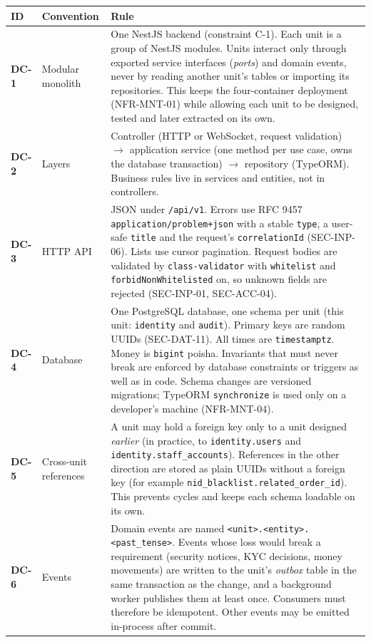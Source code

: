 \documentclass[11pt,a4paper]{article}
\newenvironment{dtable}[1]{\small\begin{longtable}{#1}}{\end{longtable}}
\begin{document}
\begin{dtable}{@{}>{\bfseries}p{1.1cm}>{\raggedright\arraybackslash}p{3.4cm}>{\raggedright\arraybackslash}p{10.6cm}@{}}
\toprule
\textnormal{\textbf{ID}} & \textbf{Convention} & \textbf{Rule} \\ \midrule \endhead
DC-1 & Modular monolith & One NestJS backend (constraint C-1). Each unit is a group of NestJS modules. Units interact only through exported service interfaces (\emph{ports}) and domain events, never by reading another unit's tables or importing its repositories. This keeps the four-container deployment (NFR-MNT-01) while allowing each unit to be designed, tested and later extracted on its own. \\
DC-2 & Layers & Controller (HTTP or WebSocket, request validation) $\rightarrow$ application service (one method per use case, owns the database transaction) $\rightarrow$ repository (TypeORM). Business rules live in services and entities, not in controllers. \\
DC-3 & HTTP API & JSON under \texttt{/api/v1}. Errors use RFC 9457 \texttt{application/problem+json} with a stable \texttt{type}, a user-safe \texttt{title} and the request's \texttt{correlationId} (SEC-INP-06). Lists use cursor pagination. Request bodies are validated by \texttt{class-validator} with \texttt{whitelist} and \texttt{forbidNonWhitelisted} on, so unknown fields are rejected (SEC-INP-01, SEC-ACC-04). \\
DC-4 & Database & One PostgreSQL database, one schema per unit (this unit: \texttt{identity} and \texttt{audit}). Primary keys are random UUIDs (SEC-DAT-11). All times are \texttt{timestamptz}. Money is \texttt{bigint} poisha. Invariants that must never break are enforced by database constraints or triggers as well as in code. Schema changes are versioned migrations; TypeORM \texttt{synchronize} is used only on a developer's machine (NFR-MNT-04). \\
DC-5 & Cross-unit references & A unit may hold a foreign key only to a unit designed \emph{earlier} (in practice, to \texttt{identity.users} and \texttt{identity.staff\_accounts}). References in the other direction are stored as plain UUIDs without a foreign key (for example \texttt{nid\_blacklist.related\_order\_id}). This prevents cycles and keeps each schema loadable on its own. \\
DC-6 & Events & Domain events are named \texttt{<unit>.<entity>.<past\_tense>}. Events whose loss would break a requirement (security notices, KYC decisions, money movements) are written to the unit's \emph{outbox} table in the same transaction as the change, and a background worker publishes them at least once. Consumers must therefore be idempotent. Other events may be emitted in-process after commit. \\

\end{dtable}
\end{document}
